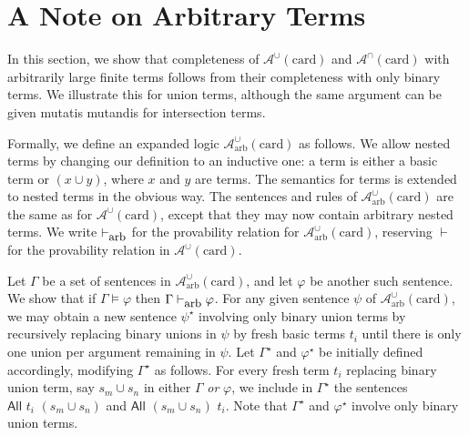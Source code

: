 \documentclass[letterpaper]{article} %
\theoremstyle{definition}
\newcommand{\proves}{\vdash}
\newcommand{\Aunion}{\mathscr{A}^{\cup}}
\newcommand{\Ainter}{\mathscr{A}^{\cap}}
\newcommand{\All}[2]{\mathsf{All}\,\,#1\,\,#2}
\newcommand{\card}{\mathrm{card}}
\newcommand{\provesarbitrary}{\proves_{\mbox{\small{arb}}}}
\begin{document}
\section{A Note on Arbitrary Terms}
\label{s:supp:arbitrary_terms}

In this section, we show that completeness of $\Aunion(\card)$ and $\Ainter(\card)$ with arbitrarily large finite terms follows from their completeness with only binary terms.  We illustrate this for union terms, although the same argument can be given mutatis mutandis for intersection terms.

Formally, we define an expanded logic $\Aunion_\mathrm{arb}(\card)$ as follows. We allow nested terms by changing our definition to an inductive one: a term is either a basic term or $(x\cup y)$, where $x$ and $y$ are terms. The semantics for terms is extended to nested terms in the obvious way. The sentences and rules of $\Aunion_\mathrm{arb}(\card)$ are the same as for $\Aunion(\card)$, except that they may now contain arbitrary nested terms.  We write $\provesarbitrary$ for the provability relation for $\Aunion_\mathrm{arb}(\card)$, reserving $\proves$ for the provability relation in $\Aunion(\card)$.

Let $\Gamma$ be a set of sentences in $\Aunion_\mathrm{arb}(\card)$, and let $\varphi$ be another such sentence.  We show that if $\Gamma \models \varphi$ then $\Gamma \provesarbitrary \varphi$. For any given sentence $\psi$ of $\Aunion_\mathrm{arb}(\card)$, we may obtain a new sentence $\psi^\star$ involving only binary union terms by recursively replacing binary unions in $\psi$ by fresh basic terms $t_i$ until there is only one union per argument remaining in $\psi$.  
Let $\Gamma^\star$ and $\varphi^\star$ be initially defined accordingly, modifying $\Gamma^\star$ as follows.  For every fresh term $t_i$ replacing binary union term, say $s_m \cup s_n$ in either $\Gamma$ \emph{or} $\varphi$, we include in $\Gamma^\star$ the sentences $\All{t_i}{(s_m \cup s_n)}$ and $\All{(s_m \cup s_n)}{t_i}$.  Note that $\Gamma^\star$ and $\varphi^\star$ involve only binary union terms.
\end{document}

